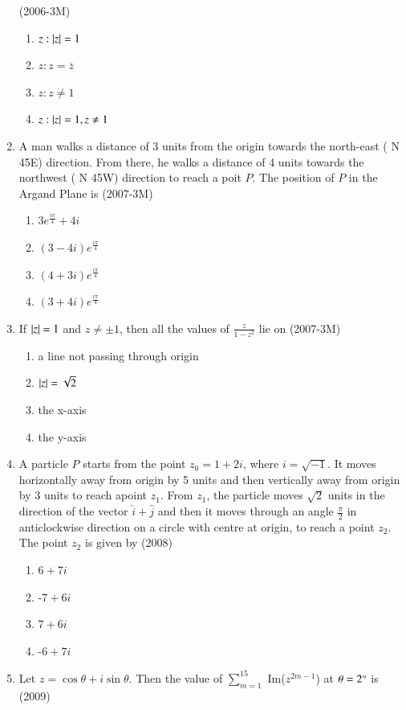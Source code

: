 \documentclass[journal,12pt,twocolumn]{IEEEtran}
\theoremstyle{remark}
\begin{document}
\begin{enumerate}
	\hfill{(2006-3M)}
\begin{enumerate}[label=(\alph*)]
	\item {$z:\left\vert z\right\vert=1$}
	\item {$z:z= \overline{z}$}
	\item {$z:z \neq 1 $}
	\item {$z:\left\vert z\right\vert=1, z\neq1$}
\end{enumerate}
\item A man walks a distance of 3 units from the origin towards the north-east ( N 45\degree E) direction. From there, he walks a distance of 4 units towards the northwest ( N 45\degree W) direction to reach a poit $P$. The position of $P$ in the Argand Plane is \hfill{(2007-3M)}
\begin{enumerate}[label=(\alph*)]
	\item $3e^{\frac{i\pi}{4}}+4i$
	\item $(3-4i)e^{\frac{i\pi}{4}}$
	\item $(4+3i)e^{\frac{i\pi}{4}}$
	\item $(3+4i)e^{\frac{i\pi}{4}}$
\end{enumerate}
\item If $\left\vert z\right\vert=1$ and $z\neq\pm1$, then all the values of $\frac{z}{1-z^{2}}$ lie on \hfill{(2007-3M)}
\begin{enumerate}[label=(\alph*)]
	\item a line not passing through origin
	\item $\left\vert z\right\vert=\sqrt{2}$
	\item the x-axis
	\item the y-axis
\end{enumerate}
\item A particle $P$ starts from the point $z_{0}=1+2i$, where $i=\sqrt{-1}$. It moves horizontally away from origin by 5 units and then vertically away from origin by 3 units to reach apoint $z_{1}$. From $z_{1}$, the particle moves $\sqrt{2}$ units in the direction of the vector $\hat{i}+\hat{j}$ and then it moves through an angle $\frac{\pi}{2}$ in anticlockwise direction on a circle with centre at origin, to reach a point $z_{2}$. The point $z_{2}$ is given by \hfill{(2008)}
\begin{enumerate}[label=(\alph*)]
	\item $6+7i$
	\item -$7+6i$
	\item $7+6i$
	\item -$6+7i$
\end{enumerate}
\item Let $z=\cos\theta+i\sin\theta$. Then the value of $\sum_{m=1} ^{15}$ Im($z^{2m-1}$) at $\theta=2\degree$ is \hfill{(2009)}

\end{enumerate}
\end{document}
